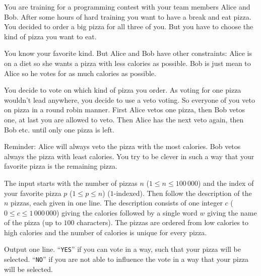 You are training for a programming contest with your team members Alice and Bob.
After some hours of hard training you want to have a break and eat pizza.
You decided to order a big pizza for all three of you.
But you have to choose the kind of pizza you want to eat.

You know your favorite kind.
But Alice and Bob have other constraints:
Alice is on a diet so she wants a pizza with less calories as possible.
Bob is just mean to Alice so he votes for as much calories as possible.

You decide to vote on which kind of pizza you order.
As voting for one pizza wouldn’t lead anywhere, you decide to use a veto voting.
So everyone of you veto on pizza in a round robin manner.
First Alice vetos one pizza, then Bob vetos one, at last you are allowed to veto.
Then Alice has the next veto again, then Bob etc. until only one pizza is left.

Reminder: Alice will always veto the pizza with the most calories.
Bob vetos always the pizza with least calories.
You try to be clever in such a way that your favorite pizza is the remaining pizza.

\begin{Input}
    The input starts with the number of pizzas $n$ ($1 \leq n \leq 100\,000$) and the index of your favorite pizza $p$ ($1 \leq p \leq n$) ($1$-indexed).
    Then follow the description of the $n$ pizzas, each given in one line.
    The description consists of one integer $c$ ($0 \leq c \leq 1\,000\,000$) giving the calories followed by a single word $w$ giving the name of the pizza (up to $100$ characters).
    The pizzas are ordered from low calories to high calories and the number of calories is unique for every pizza.
\end{Input}

\begin{Output}
    Output one line. ``\texttt{YES}'' if you can vote in a way, such that your pizza will be selected.
    ``\texttt{NO}'' if you are not able to influence the vote in a way that your pizza will be selected.
\end{Output}
